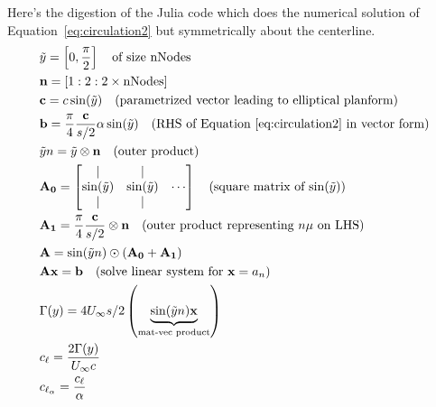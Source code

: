 \documentclass[10pt]{article}
\newcommand{\mbf}[1]{\mathbf{#1}}
\newcommand{\Uinf}{U_{\infty}}
\newcommand{\tn}[1]{\textnormal{#1}}
\begin{document}
Here's the digestion of the Julia code which does the numerical solution of Equation~\eqref{eq:circulation2} but symmetrically about the centerline.
\begin{align*}
     & \tilde{y} = \left[
        0,\frac{\pi}{2}
        \right] \quad \tn{of size nNodes}
    \\
     & \mbf{n} = \left[1:2:2\times\tn{nNodes}\right]
    \\
     & \mbf{c} = c  \sin(\tilde{y}) \quad \tn{(parametrized vector leading to elliptical planform)}
    \\
     & \mbf{b} = \frac{\pi}{4} \frac{\mbf{c}}{s/2} \alpha \sin(\tilde{y}) \quad \tn{(RHS of Equation~\eqref{eq:circulation2} in vector form)}
    \\
     & \tilde{y}n = \tilde{y} \otimes \mbf{n} \quad \tn{(outer product)}
    \\
     & \mbf{A_0} = \begin{bmatrix}
                       |               & |                        \\
                       \sin(\tilde{y}) & \sin(\tilde{y}) & \cdots \\
                       |               & |
                   \end{bmatrix} \quad \tn{(square matrix of $\sin(\tilde{y})$)}
    \\
     & \mbf{A_1} = \frac{\pi}{4} \frac{\mbf{c}}{s/2} \otimes \mbf{n} \quad \tn{(outer product representing $n\mu$ on LHS)}
    \\
     & \mbf{A} = \sin(\tilde{y} n ) \odot \left( \mbf{A_0}+\mbf{A_1} \right)                                                                  \\
     & \mbf{A}\mbf{x} = \mbf{b} \quad \tn{(solve linear system for $\mbf{x} = a_n$)}                                                          \\
     & \Gamma(y) = 4 \Uinf s/2 \left(\underbrace{\sin(\tilde{y}n)\mbf{x} }_{\tn{mat-vec product}} \right)                                     \\
     & c_\ell = \frac{2\Gamma(y)}{\Uinf {c}}                                                                                                  \\
     & c_{\ell_{\alpha}} = \frac{c_\ell}{\alpha}
\end{align*}
\end{document}
